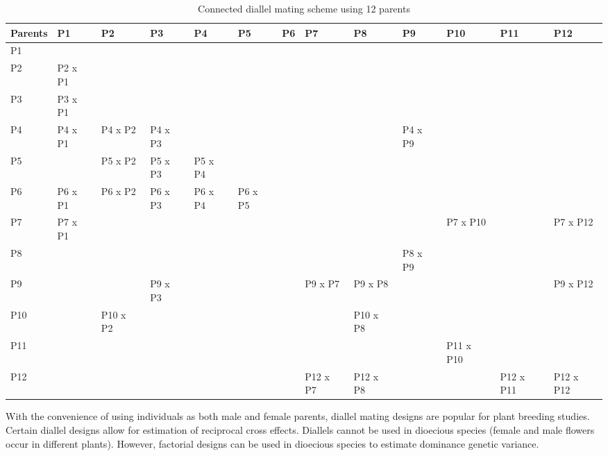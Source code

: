 \documentclass[nofonts,]{tufte-handout}
\begin{document}
\begingroup\fontsize{8}{10}\selectfont

\begin{longtable}{>{\raggedright\arraybackslash}p{3.5em}>{\raggedright\arraybackslash}p{3.5em}>{\raggedright\arraybackslash}p{3.5em}>{\raggedright\arraybackslash}p{3.5em}>{\raggedright\arraybackslash}p{3.5em}>{\raggedright\arraybackslash}p{3.5em}>{\raggedright\arraybackslash}p{3.5em}>{\raggedright\arraybackslash}p{3.5em}>{\raggedright\arraybackslash}p{3.5em}>{\raggedright\arraybackslash}p{3.5em}>{\raggedright\arraybackslash}p{3.5em}ll}
\caption{\label{tab:connected-diallel}Connected diallel mating scheme using 12 parents}\\
\toprule
Parents & P1 & P2 & P3 & P4 & P5 & P6 & P7 & P8 & P9 & P10 & P11 & P12\\
\midrule
\rowcolor{gray!6}  P1 &  &  &  &  &  &  &  &  &  &  &  & \\
P2 & P2 x P1 &  &  &  &  &  &  &  &  &  &  & \\
\rowcolor{gray!6}  P3 & P3 x P1 &  &  &  &  &  &  &  &  &  &  & \\
P4 & P4 x P1 & P4 x P2 & P4 x P3 &  &  &  &  &  & P4 x P9 &  &  & \\
\rowcolor{gray!6}  P5 &  & P5 x P2 & P5 x P3 & P5 x P4 &  &  &  &  &  &  &  & \\
\addlinespace
P6 & P6 x P1 & P6 x P2 & P6 x P3 & P6 x P4 & P6 x P5 &  &  &  &  &  &  & \\
\rowcolor{gray!6}  P7 & P7 x P1 &  &  &  &  &  &  &  &  & P7 x P10 &  & P7 x P12\\
P8 &  &  &  &  &  &  &  &  & P8 x P9 &  &  & \\
\rowcolor{gray!6}  P9 &  &  & P9 x P3 &  &  &  & P9 x P7 & P9 x P8 &  &  &  & P9 x P12\\
P10 &  & P10 x P2 &  &  &  &  &  & P10 x P8 &  &  &  & \\
\addlinespace
\rowcolor{gray!6}  P11 &  &  &  &  &  &  &  &  &  & P11 x P10 &  & \\
P12 &  &  &  &  &  &  & P12 x P7 & P12 x P8 &  &  & P12 x P11 & P12 x P12\\
\bottomrule
\end{longtable}
\endgroup{}

With the convenience of using individuals as both male and female
parents, diallel mating designs are popular for plant breeding studies.
Certain diallel designs allow for estimation of reciprocal cross
effects. Diallels cannot be used in dioecious species (female and male
flowers occur in different plants). However, factorial designs can be
used in dioecious species to estimate dominance genetic variance.
\end{document}
